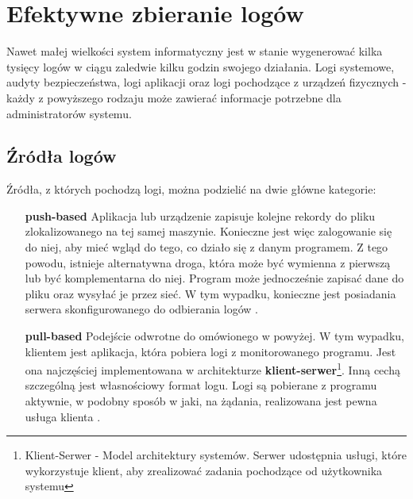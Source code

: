 \section{Efektywne zbieranie logów}
\label{logs:collecting}

    Nawet małej wielkości system informatyczny jest w stanie wygenerować kilka tysięcy logów w ciągu
    zaledwie kilku godzin swojego działania. Logi systemowe, audyty bezpieczeństwa, logi aplikacji oraz
    logi pochodzące z urządzeń fizycznych - każdy z powyższego rodzaju może zawierać informacje potrzebne
    dla administratorów systemu. 
    
    \subsection{Źródła logów}
    \label{logs:collecting:source}
    Źródła, z których pochodzą logi, można podzielić na dwie główne kategorie:
    \begin{itemize}
        \item[\textbf{push-based}]
            Aplikacja lub urządzenie zapisuje kolejne rekordy do pliku zlokalizowanego
            na tej samej maszynie. Konieczne jest więc zalogowanie się do niej, aby 
            mieć wgląd do tego, co działo się z danym programem. Z tego powodu, istnieje
            alternatywna droga, która może być wymienna z pierwszą lub być komplementarna do niej.
            Program może jednocześnie zapisać dane do pliku oraz wysyłać je przez sieć. W tym
            wypadku, konieczne jest posiadania serwera skonfigurowanego do odbierania logów 
            \cite{logging_log_management}.
        \item[\textbf{pull-based}]
            Podejście odwrotne do omówionego w powyżej. W tym wypadku,
            klientem jest aplikacja, która pobiera logi z monitorowanego programu. Jest ona najczęściej
            implementowana w architekturze \textbf{klient-serwer}\footnote{Klient-Serwer - Model architektury
                systemów. Serwer udostępnia usługi, które wykorzystuje klient, aby zrealizować zadania
                pochodzące od użytkownika systemu}. Inną cechą szczególną jest własnościowy format logu.
            Logi są pobierane z programu aktywnie, w podobny sposób w jaki, na żądania, realizowana
            jest pewna usługa klienta \cite{logging_log_management}.
    \end{itemize}
    
